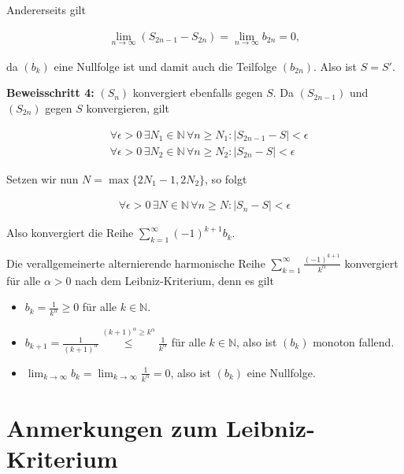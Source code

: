 \documentclass[fontsize=9pt,
               parskip=half-,
               DIV=14,
               listof=chapterentry,
               tocflat]{scrbook}
\begin{document}
\begin{proof*}
Andererseits gilt

\begin{align*}
\lim _{n\to \infty }(S_{2n-1}-S_{2n})=\lim _{n\to \infty }b_{2n}=0,
\end{align*}

da $(b_{k})$ eine Nullfolge ist und damit auch die Teilfolge $(b_{2n})$. Also ist $S=S'$.

\textbf{Beweisschritt 4:} $(S_{n})$ konvergiert ebenfalls gegen $S$. Da $(S_{2n-1})$ und $(S_{2n})$ gegen $S$ konvergieren, gilt

\begin{align*}
&\forall \epsilon >0\,\exists N_{1}\in \mathbb {N} \,\forall n\geq N_{1}:|S_{2n-1}-S|<\epsilon \\[0.5em]&\forall \epsilon >0\,\exists N_{2}\in \mathbb {N} \,\forall n\geq N_{2}:|S_{2n}-S|<\epsilon 
\end{align*}

Setzen wir nun $N=\max\{2N_{1}-1,2N_{2}\}$, so folgt

\begin{align*}
\forall \epsilon >0\,\exists N\in \mathbb {N} \,\forall n\geq N:|S_{n}-S|<\epsilon 
\end{align*}

Also konvergiert die Reihe $\sum _{k=1}^{\infty }(-1)^{k+1}b_{k}$.

\end{proof*}

\begin{example*}
Die verallgemeinerte alternierende harmonische Reihe $\sum _{k=1}^{\infty }{\tfrac {(-1)^{k+1}}{k^{\alpha }}}$ konvergiert für alle $\alpha >0$ nach dem Leibniz-Kriterium, denn es gilt

\begin{itemize}
\item $b_{k}={\tfrac {1}{k^{\alpha }}}\geq 0$ für alle $k\in \mathbb {N} $.
\item $b_{k+1}={\tfrac {1}{(k+1)^{\alpha }}}{\overset {(k+1)^{\alpha }\geq k^{\alpha }}{\leq }}{\tfrac {1}{k^{\alpha }}}$ für alle $k\in \mathbb {N} $, also ist $(b_{k})$ monoton fallend.
\item $\lim _{k\to \infty }b_{k}=\lim _{k\to \infty }{\tfrac {1}{k^{\alpha }}}=0$, also ist $(b_{k})$ eine Nullfolge.
\end{itemize}

\end{example*}

\section{Anmerkungen zum Leibniz-Kriterium}
\end{document}

